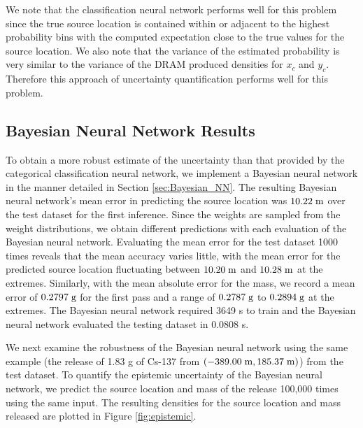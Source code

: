 \documentclass[sn-mathphys-ay]{sn-jnl}
\begin{document}
We note that the classification neural network performs well for this problem since the true source location is contained within or adjacent to the highest probability bins with the computed expectation close to the true values for the source location. We also note that the variance of the estimated probability is very similar to the variance of the DRAM produced densities for $x_c$ and $y_c$. Therefore this approach of uncertainty quantification performs well for this problem.

\subsection{Bayesian Neural Network Results}
To obtain a more robust estimate of the uncertainty than that provided by the categorical classification neural network, we implement a Bayesian neural network in the manner detailed in Section \ref{sec:Bayesian_NN}. The resulting Bayesian neural network's mean error in predicting the source location was $10.22 \hspace{1mm} \text{m}$ over the test dataset for the first inference. Since the weights are sampled from the weight distributions, we obtain different predictions with each evaluation of the Bayesian neural network. Evaluating the mean error for the test dataset 1000 times reveals that the mean accuracy varies little, with the mean error for the predicted source location fluctuating between $10.20 \hspace{1mm} \text{m}$ and $10.28 \hspace{1mm} \text{m}$ at the extremes. Similarly, with the mean absolute error for the mass, we record a mean error of $0.2797 \hspace{1mm} \text{g}$ for the first pass and a range of $0.2787 \hspace{1mm} \text{g}$ to $0.2894 \hspace{1mm} \text{g}$ at the extremes. The Bayesian neural network required 3649 s to train and the Bayesian neural network evaluated the testing dataset in 0.0808 s.

We next examine the robustness of the Bayesian neural network using the same example (the release of 1.83 g of Cs-137 from $(-389.00 \hspace{1mm} \text{m}, 185.37 \hspace{1mm} \text{m})$) from the test dataset. To quantify the epistemic uncertainty of the Bayesian neural network, we predict the source location and mass of the release 100{,}000 times using the same input. The resulting densities for the source location and mass released are plotted in Figure \ref{fig:epistemic}.
 
\end{document}
